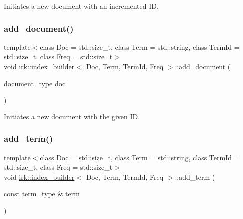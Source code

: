 Initiates a new document with an incremented ID. 

\mbox{\label{classirk_1_1index__builder_ac7c266fbf628b828059ac89b6f6ad1cc}} 
\subsubsection{\texorpdfstring{add\+\_\+document()}{add\_document()}\hspace{0.1cm}{\footnotesize\ttfamily [2/2]}}
{\footnotesize\ttfamily template$<$class Doc  = std\+::size\+\_\+t, class Term  = std\+::string, class Term\+Id  = std\+::size\+\_\+t, class Freq  = std\+::size\+\_\+t$>$ \\
void \mbox{\hyperlink{classirk_1_1index__builder}{irk\+::index\+\_\+builder}}$<$ Doc, Term, Term\+Id, Freq $>$\+::add\+\_\+document (\begin{DoxyParamCaption}\item[{\mbox{\hyperlink{classirk_1_1index__builder_a4230ae91e9f84c95ee99b3607c6e952e}{document\+\_\+type}}}]{doc }\end{DoxyParamCaption})\hspace{0.3cm}{\ttfamily [inline]}}



Initiates a new document with the given ID. 

\mbox{\label{classirk_1_1index__builder_a73e03d40562487c47ed14f6d2412c7ca}} 
\subsubsection{\texorpdfstring{add\+\_\+term()}{add\_term()}}
{\footnotesize\ttfamily template$<$class Doc  = std\+::size\+\_\+t, class Term  = std\+::string, class Term\+Id  = std\+::size\+\_\+t, class Freq  = std\+::size\+\_\+t$>$ \\
void \mbox{\hyperlink{classirk_1_1index__builder}{irk\+::index\+\_\+builder}}$<$ Doc, Term, Term\+Id, Freq $>$\+::add\+\_\+term (\begin{DoxyParamCaption}\item[{const \mbox{\hyperlink{classirk_1_1index__builder_ad80a8f10f3e72ed3b9a2f181350f3f1f}{term\+\_\+type}} \&}]{term }\end{DoxyParamCaption})\hspace{0.3cm}{\ttfamily [inline]}}



